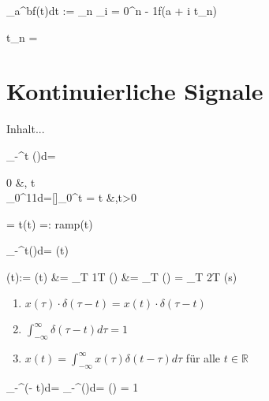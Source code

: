\begin{abox}
	\int_{a}^{b}f(t)dt := \lim\limits_{n \to \infty}\sum_{i = 0}^{n - 1}f(a + i \cdot \varDelta t_n)
\end{abox}

\begin{abox}
	\varDelta t_n = 
\end{abox}


\chapter{Kontinuierliche Signale}

\begin{abox}
	Inhalt...
\end{abox}

\setcounter{BoxCounter}{170}

\begin{abox}
	\int_{-\infty}^{t} \epsilon(\tau)d\tau= \begin{cases}
		0 &, t\\
		\int_{0}^{1}1d\tau=[\tau]_0^t = t &,t>0
	\end{cases} \quad = t\cdot \epsilon(t) =: ramp(t)
\end{abox}

\begin{abox}
	\int_{-\infty}^{t}\delta(\tau)d\tau = \epsilon(t)
\end{abox}

\begin{abox}
	\delta(t):= \epsilon(t) &= \lim\limits_{T } \frac1T ()
	&= \lim\limits_{T }  () = 
	\lim\limits_{T } \frac2T (s\pi{})
\end{abox}

\begin{tbox}
	\begin{enumerate}[label=\Roman*)]
		\item $x(\tau) \cdot \delta(\tau - t) = x(t) \cdot \delta(\tau - t)$
		\item $\int_{-\infty}^{\infty}\delta(\tau - t)d\tau = 1$
		\item $x(t) = \int_{-\infty}^{\infty}x(\tau)\delta(t-\tau)d\tau$ für alle $ t \in \mathbb{R}$
	\end{enumerate}
\end{tbox}

\begin{abox}
	\int_{-\infty}^{\infty}\delta(\tau - t)d\tau = \int_{-\infty}^{\infty}\delta(\lambda)d\lambda = \epsilon(\infty) = 1
\end{abox}


